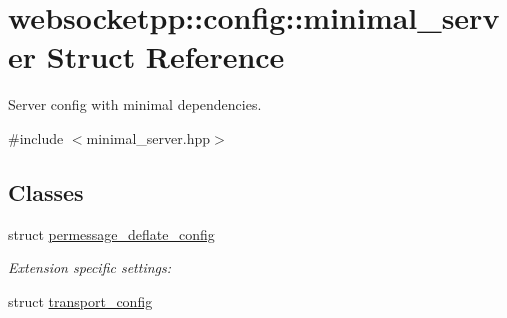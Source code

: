 \hypertarget{structwebsocketpp_1_1config_1_1minimal__server}{}\section{websocketpp\+:\+:config\+:\+:minimal\+\_\+server Struct Reference}
\label{structwebsocketpp_1_1config_1_1minimal__server}


Server config with minimal dependencies.  




{\ttfamily \#include $<$minimal\+\_\+server.\+hpp$>$}

\subsection*{Classes}
\begin{DoxyCompactItemize}
\item 
struct \hyperlink{structwebsocketpp_1_1config_1_1minimal__server_1_1permessage__deflate__config}{permessage\+\_\+deflate\+\_\+config}
\begin{DoxyCompactList}\small\item\em Extension specific settings\+: \end{DoxyCompactList}\item 
struct \hyperlink{structwebsocketpp_1_1config_1_1minimal__server_1_1transport__config}{transport\+\_\+config}
\end{DoxyCompactItemize}
